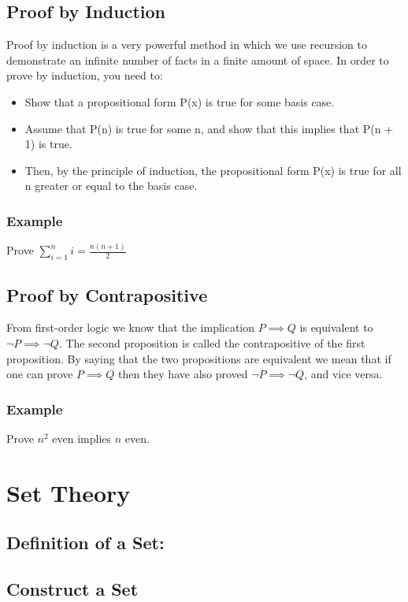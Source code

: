 \documentclass{article}
\begin{document}
\subsection{Proof by Induction}
Proof by induction is a very powerful method in which we use recursion to
demonstrate an infinite number of facts in a finite amount of space. In order to prove by induction, you need to:
\begin{itemize}
    \item Show that a propositional form P(x) is true for some basis case.
    \item Assume that P(n) is true for some n, and show that this implies that
    P(n + 1) is true.
    \item  Then, by the principle of induction, the propositional form P(x) is true
    for all n greater or equal to the basis case.
\end{itemize}
\subsubsection{Example}
Prove $\sum_{i=1}^n i =\frac{n(n+1)}{2}$
\vspace{60px}
\subsection{Proof by Contrapositive}
From first-order logic we know that the implication $P \implies Q$ is equivalent
to $\neg P \implies \neg Q$. The second proposition is called the contrapositive of the first
proposition. By saying that the two propositions are equivalent we mean that
if one can prove $P \implies Q$ then they have also proved $\neg P \implies \neg Q$, and vice versa.
\subsubsection{Example}
Prove $n^2$ even implies $n$ even.
\pagebreak

\section{Set Theory}
\subsection{Definition of a Set:}
\vspace{20px}
\subsection{Construct a Set}
\end{document}

